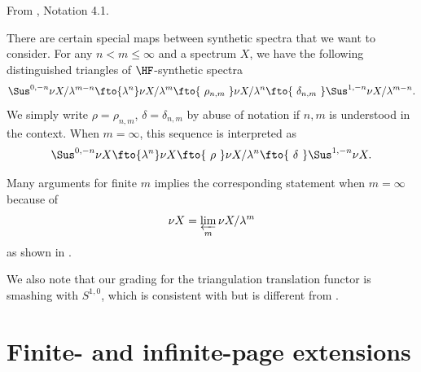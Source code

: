 \begin{notation}
\label{notation:AdamsSynthetic:quotient-boundary-maps}
\label{not:deltaandrho}
From \cite{LWX126}, Notation 4.1.\par
There are certain special maps between synthetic spectra that we want to consider. For any $n<m\le \infty$ and a spectrum $X$, we have the following  distinguished triangles of $\HF$-synthetic spectra
$$\Sus^{0,-n}\nu X/\lambda^{m-n}\fto{\lambda^n} \nu X/\lambda^m\fto{~\rho_{n,m}~} \nu X/\lambda^n\fto{~\delta_{n,m}~} \Sus^{1,-n}\nu X/\lambda^{m-n}.$$
We simply write $\rho=\rho_{n,m}$, $\delta=\delta_{n,m}$ by abuse of notation if $n,m$ is understood in the context.
When $m=\infty$, this sequence is interpreted  as
$$\Sus^{0,-n}\nu X\fto{\lambda^n} \nu X\fto{~\rho~} \nu X/\lambda^n\fto{~\delta~} \Sus^{1,-n}\nu X.$$

Many arguments for finite $m$ implies the corresponding statement when $m=\infty$ because of
$$\nu X=\varprojlim_{m} \nu X/\lambda^m$$
as shown in \cite[Proposition A.13]{BHS}.

We also note that our grading for the triangulation translation functor is smashing with $S^{1,0}$, which is consistent with \cite[Appendix A]{BHS} but is different from \cite[Section 7]{BurklundXu}.
\end{notation}

\section{Finite- and infinite-page extensions}

